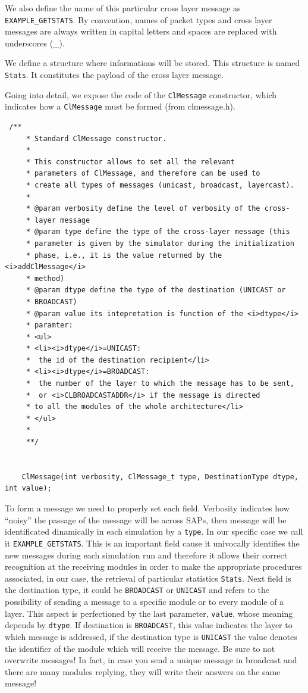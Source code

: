 \documentclass[a4paper,10pt]{article}
\begin{document}
We also define the name of this particular cross layer message as \verb=EXAMPLE_GETSTATS=. By convention, names of packet types and cross layer messages are always written in capital letters and spaces are replaced with underscores (\_).

We define a structure where informations will be stored. This structure is named \verb=Stats=. It constitutes the payload of the cross layer message.

Going into detail, we expose the code of the \verb=ClMessage= constructor, which indicates how a \verb=ClMessage= must be formed (from clmessage.h).

\begin{verbatim}
 /**
	 * Standard ClMessage constructor.
	 *
	 * This constructor allows to set all the relevant
	 * parameters of ClMessage, and therefore can be used to
	 * create all types of messages (unicast, broadcast, layercast).
	 * 
	 * @param verbosity define the level of verbosity of the cross-
	 * layer message
	 * @param type define the type of the cross-layer message (this
	 * parameter is given by the simulator during the initialization
	 * phase, i.e., it is the value returned by the <i>addClMessage</i>
	 * method)
	 * @param dtype define the type of the destination (UNICAST or
	 * BROADCAST)
	 * @param value its intepretation is function of the <i>dtype</i>
	 * paramter:
	 * <ul>
	 * <li><i>dtype</i>=UNICAST:
	 * 	the id of the destination recipient</li>
	 * <li><i>dtype</i>=BROADCAST:
	 * 	the number of the layer to which the message has to be sent,
	 * 	or <i>CLBROADCASTADDR</i> if the message is directed
	 * to all the modules of the whole architecture</li> 
	 * </ul> 
	 *
	 **/


	ClMessage(int verbosity, ClMessage_t type, DestinationType dtype, int value);
\end{verbatim}
\vspace{0.6cm}

To form a message we need to properly set each field. Verbosity indicates how ``noisy'' the passage of the message will be across SAPs, then message will be identificated dinamically in each simulation by a \verb=type=. In our specific case we call it \verb=EXAMPLE_GETSTATS=. This is an important field cause it univocally identifies the new messages during each simulation run and therefore it allows their correct recognition at the receiving modules in order to make the appropriate procedures associated, in our case, the retrieval of particular statistics \verb=Stats=. Next field is the destination type, it could be \verb=BROADCAST= or \verb=UNICAST= and refers to the possibility of sending a message to a specific module or to every module of a layer. This aspect is perfectioned by the last parameter, \verb=value=, whose meaning depends by \verb=dtype=. If destination is \verb=BROADCAST=, this value indicates the layer to which message is addressed, if the destination type is \verb=UNICAST= the value denotes the identifier of the module which will receive the message. Be sure to not overwrite messages! In fact, in case you send a unique message in broadcast and there are many modules replying, they will write their answers on the same message!
\end{document}
